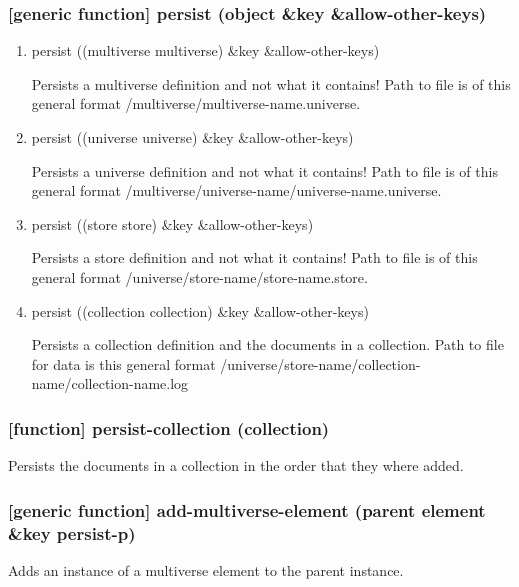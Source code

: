 \documentclass[11pt]{article}
\begin{document}
\subsubsection{[generic function] persist (object \&key \&allow-other-keys)}
\label{sec:orge101029}

\begin{enumerate}
\item persist ((multiverse multiverse) \&key \&allow-other-keys)
\label{sec:org4efedc3}

Persists a multiverse definition and not what it contains! Path to
file is of this general format /multiverse/multiverse-name.universe.

\item persist ((universe universe) \&key \&allow-other-keys)
\label{sec:org918fff8}

Persists a universe definition and not what it contains! Path to file
is of this general format
/multiverse/universe-name/universe-name.universe.

\item persist ((store store) \&key \&allow-other-keys)
\label{sec:orgf9f9dc9}

Persists a store definition and not what it contains! Path to file is
of this general format /universe/store-name/store-name.store.

\item persist ((collection collection) \&key \&allow-other-keys)
\label{sec:org6b709ac}

Persists a collection definition and the documents in a
collection. Path to file for data is this general format
/universe/store-name/collection-name/collection-name.log
\end{enumerate}

\subsubsection{[function] persist-collection (collection)}
\label{sec:org72d8d06}

Persists the documents in a collection in the order that they where
added.

\subsubsection{[generic function] add-multiverse-element (parent element \&key persist-p)}
\label{sec:org9e43c95}

Adds an instance of a multiverse element to the parent instance.
\end{document}

